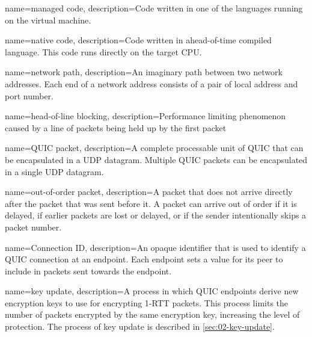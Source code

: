 \makeglossaries

\renewcommand{\glsnamefont}[1]{\capitalisewords{#1}}

\newcommand{\newdefinedabbreviation}[4]{
    \newglossaryentry{#1}
    {
        text={#2},
        long={#3},
        name={#3 (#2)},
        first={#3 (#2)},
        firstplural={\glsentrylong{#1}\glspluralsuffix (\glsentryname{#1}\glspluralsuffix )},
        description={#4}
    }
}

{
  name=managed code,
  description={Code written in one of the \dotnet{} languages running on the \dotnet{} virtual machine.}
}

{
  name=native code,
  description={Code written in ahead-of-time compiled language. This code runs directly on the target CPU.}
}

{
    name=network path,
    description={An imaginary path between two network addresses. Each end of a network address consists of a pair of local address and port number.}
}

{
    name=head-of-line blocking,
    description={Performance limiting phenomenon caused by a line of packets being held up by the first packet}
}

{
    name=QUIC packet,
    description={A complete processable unit of QUIC that can be encapsulated in a UDP datagram.
Multiple QUIC packets can be encapsulated in a single UDP datagram.}
}

{
  name=out-of-order packet,
  description={A packet that does not arrive directly after the packet that was
  sent before it.  A packet can arrive out of order if it is delayed, if earlier packets are
  lost or delayed, or if the sender intentionally skips a packet number.}
}

{
  name=Connection ID,
  description={An opaque identifier that is used to identify a QUIC
  connection at an endpoint.  Each endpoint sets a value for its
  peer to include in packets sent towards the endpoint.}
}

{
  name=key update,
  description={A process in which QUIC endpoints derive new encryption keys to use for encrypting 1-RTT packets. This process limits the number of packets encrypted by the same encryption key, increasing the level of protection. The process of key update is described in \autoref{sec:02-key-update}.}
}

